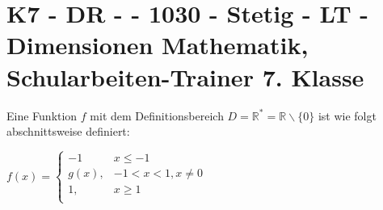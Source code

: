 \section{K7 - DR -  - 1030 - Stetig - LT - Dimensionen Mathematik, Schularbeiten-Trainer 7. Klasse}

\begin{beispiel}[K7 - DR]{1} %
Eine Funktion $f$ mit dem Definitionsbereich $D=\mathbb{R}^*=\mathbb{R}\backslash \{0\}$ ist wie folgt abschnittsweise definiert:

$f(x)=\begin{cases}-1&x\leq -1\\
g(x),&-1<x<1, x\neq 0\\
1,&x\geq 1\\
\end{cases}$

				
				\end{beispiel}